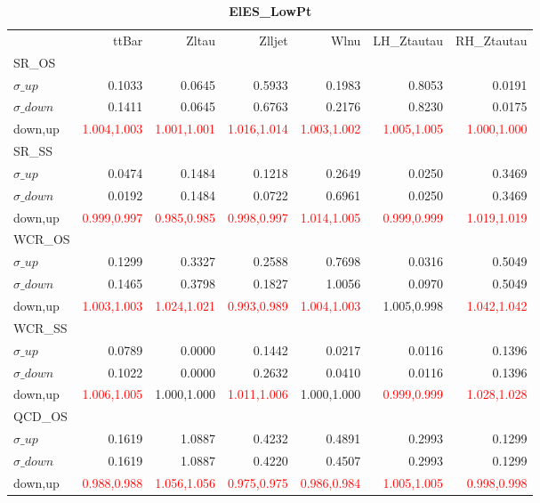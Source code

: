 \documentclass[11pt,oneside,a4paper]{article}
\begin{document}
\begin{table}
\centering
\caption{\bf{ElES\_LowPt}}
\begin{tabular}{lrrrrrr}
 & ttBar & Zltau & Zlljet & Wlnu & LH\_Ztautau & RH\_Ztautau \\
SR\_OS &  &  &  &  &  &  \\
$\sigma\_up$ & 0.1033 & 0.0645 & 0.5933 & 0.1983 & 0.8053 & 0.0191 \\
$\sigma\_down$ & 0.1411 & 0.0645 & 0.6763 & 0.2176 & 0.8230 & 0.0175 \\
down,up & \textcolor{red}{1.004,1.003} & \textcolor{red}{1.001,1.001} & \textcolor{red}{1.016,1.014} & \textcolor{red}{1.003,1.002} & \textcolor{red}{1.005,1.005} & \textcolor{red}{1.000,1.000} \\

\hline
SR\_SS &  &  &  &  &  &  \\
$\sigma\_up$ & 0.0474 & 0.1484 & 0.1218 & 0.2649 & 0.0250 & 0.3469 \\
$\sigma\_down$ & 0.0192 & 0.1484 & 0.0722 & 0.6961 & 0.0250 & 0.3469 \\
down,up & \textcolor{red}{0.999,0.997} & \textcolor{red}{0.985,0.985} & \textcolor{red}{0.998,0.997} & \textcolor{red}{1.014,1.005} & \textcolor{red}{0.999,0.999} & \textcolor{red}{1.019,1.019} \\

\hline
WCR\_OS &  &  &  &  &  &  \\
$\sigma\_up$ & 0.1299 & 0.3327 & 0.2588 & 0.7698 & 0.0316 & 0.5049 \\
$\sigma\_down$ & 0.1465 & 0.3798 & 0.1827 & 1.0056 & 0.0970 & 0.5049 \\
down,up & \textcolor{red}{1.003,1.003} & \textcolor{red}{1.024,1.021} & \textcolor{red}{0.993,0.989} & \textcolor{red}{1.004,1.003} & 1.005,0.998 & \textcolor{red}{1.042,1.042} \\

\hline
WCR\_SS &  &  &  &  &  &  \\
$\sigma\_up$ & 0.0789 & 0.0000 & 0.1442 & 0.0217 & 0.0116 & 0.1396 \\
$\sigma\_down$ & 0.1022 & 0.0000 & 0.2632 & 0.0410 & 0.0116 & 0.1396 \\
down,up & \textcolor{red}{1.006,1.005} & 1.000,1.000 & \textcolor{red}{1.011,1.006} & 1.000,1.000 & \textcolor{red}{0.999,0.999} & \textcolor{red}{1.028,1.028} \\

\hline
QCD\_OS &  &  &  &  &  &  \\
$\sigma\_up$ & 0.1619 & 1.0887 & 0.4232 & 0.4891 & 0.2993 & 0.1299 \\
$\sigma\_down$ & 0.1619 & 1.0887 & 0.4220 & 0.4507 & 0.2993 & 0.1299 \\
down,up & \textcolor{red}{0.988,0.988} & \textcolor{red}{1.056,1.056} & \textcolor{red}{0.975,0.975} & \textcolor{red}{0.986,0.984} & \textcolor{red}{1.005,1.005} & \textcolor{red}{0.998,0.998} \\


\end{tabular}
\end{table}
\end{document}
